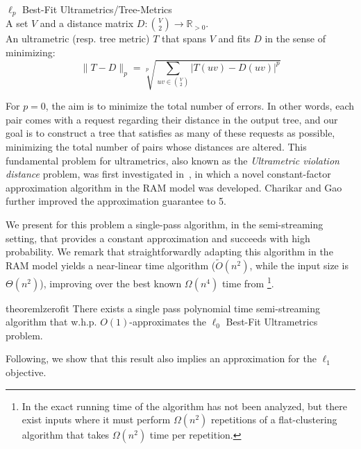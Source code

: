 \documentclass{article}
\begin{document}
 $\ell_p$ Best-Fit Ultrametrics/Tree-Metrics \smallskip\\
 A set $V$ 
and a distance matrix \( D: \binom{V}{2} \rightarrow \mathbb{R}_{>0} \).
\smallskip\\
 An ultrametric (resp. tree metric) $T$ that spans $V$ and 
fits $D$ in the sense of minimizing:
\begin{equation*}
\|T-D\|_p=\sqrt[p]{\sum_{uv\in \binom{V}{2}} |T(uv)-D(uv)|^p}
\end{equation*}

\vspace{-2mm}
For \(p=0\), the aim is to minimize the total number of errors. In other words, each pair comes with a request regarding their distance in the output tree, and our goal is to construct a tree that satisfies as many of these requests as possible, minimizing the total number of pairs whose distances are altered. This fundamental problem for ultrametrics, also known as the \emph{Ultrametric violation distance} problem, was first investigated in~\cite{cohen2022fitting}, in which a novel constant-factor approximation algorithm in the RAM model was developed.
Charikar and Gao~\cite{CharikarG24} further improved the approximation guarantee to 5. 

We present for this problem a single-pass algorithm, in the semi-streaming setting, that provides a constant approximation and succeeds with high probability.
We remark that straightforwardly adapting this algorithm in the RAM model yields a near-linear time algorithm ($\widetilde{O}(n^2)$, while the input size is $\Theta(n^2)$), improving over the best known $\Omega(n^4)$ time from \cite{cohen2022fitting}\footnote{In \cite{cohen2022fitting} the exact running time of the algorithm has not been analyzed, but there exist inputs where it must perform $\Omega(n^2)$ repetitions of a flat-clustering algorithm that takes $\Omega(n^2)$ time per repetition.}.

\begin{restatable}{theorem}{lzerofit}\label{theorem:lzerofit}
There exists a single pass polynomial time semi-streaming algorithm that
w.h.p. $O(1)$-approximates the $\ell_0$ Best-Fit Ultrametrics problem.
\end{restatable}

Following, we show that this result also implies an approximation for the $\ell_1$ objective.
\end{document}
